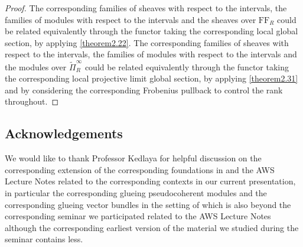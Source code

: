 \documentclass[12pt]{amsart}
\theoremstyle{definition}
\numberwithin{equation}{section}
\begin{document}
\begin{proof}
The corresponding families of sheaves with respect to the intervals, the families of modules with respect to the intervals and the sheaves over $\mathrm{FF}_R$ could be related equivalently through the functor taking the corresponding local global section, by applying \cref{theorem2.22}. The corresponding families of sheaves with respect to the intervals, the families of modules with respect to the intervals and the modules over $\widetilde{\Pi}^\infty_R$ could be related equivalently through the functor taking the corresponding local projective limit global section, by applying \cref{theorem2.31} and by considering the corresponding Frobenius pullback to control the rank throughout. 	
\end{proof}















\newpage

\subsection*{Acknowledgements} 

We would like to thank Professor Kedlaya for helpful discussion on the corresponding extension of the corresponding foundations in \cite{KL2} and the AWS Lecture Notes \cite{Ked2} related to the corresponding contexts in our current presentation, in particular the corresponding glueing pseudocoherent modules and the corresponding glueing vector bundles in the setting of \cite{KL1} which is also beyond the corresponding seminar we participated related to the AWS Lecture Notes \cite{Ked2} although the corresponding earliest version of the material we studied during the seminar contains less. 



\newpage
\end{document}

